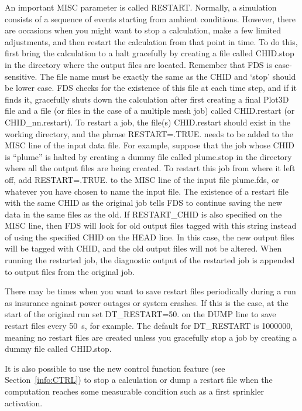 \documentclass[11pt]{book}
\begin{document}
An important {\ct MISC} parameter is called {\ct RESTART}. Normally, a simulation consists of a sequence of events
starting from ambient conditions. However, there are occasions
when you might want to stop a calculation, make a few
limited adjustments, and then
restart the calculation from that point in time. To do this,
first bring the calculation to a halt gracefully by creating a file
called {\ct CHID.stop}
in the directory where the output files are located. Remember that
FDS is case-sensitive. The file name must be exactly the same as
the {\ct CHID} and `stop' should be lower case. FDS checks for the
existence of this file at each time step, and if it finds it, gracefully
shuts down the calculation after first creating a final Plot3D
file and a file (or files in the case of a multiple mesh job)
called {\ct CHID.restart} (or {\ct CHID\_nn.restart}).
To restart a job, the file(s) {\ct CHID.restart} should exist in
the working directory, and
the phrase {\ct RESTART=.TRUE.} needs to be added
to the {\ct MISC} line of the input data file.
For example, suppose that the job
whose {\ct CHID} is ``plume'' is halted by creating a
dummy file called {\ct plume.stop} in the directory where
all the output files are being created. To restart this job from where it
left off, add {\ct RESTART=.TRUE.} to the {\ct MISC} line
of the input file {\ct plume.fds}, or whatever you have chosen to
name the input file. The existence of a restart file with the same
{\ct CHID} as the original job tells FDS
to continue saving the new data in the same files as the old.  If {\ct RESTART\_CHID} is also specified on the
{\ct MISC} line, then FDS will look for old output files tagged with this string instead of using the specified
{\ct CHID} on the {\ct HEAD} line. In this case, the new output files will be tagged with {\ct CHID}, and the
old output files will not be altered. When running the restarted job, the diagnostic output of the restarted job is appended to output files from the original job.

There may be times when you want to save restart files periodically
during a run as insurance against power outages or system crashes.
If this is the case, at the start of the original run
set {\ct DT\_RESTART=50.} on the {\ct DUMP} line to save restart files
every 50~s, for example.
The default for {\ct DT\_RESTART} is 1000000, meaning no restart files are
created unless you gracefully stop a job by
creating a dummy file called {\ct CHID.stop}.

It is also possible to use the new control function feature (see Section~\ref{info:CTRL})
to stop a calculation or dump a restart file when the computation reaches
some measurable condition such as a first sprinkler activation.
\end{document}
